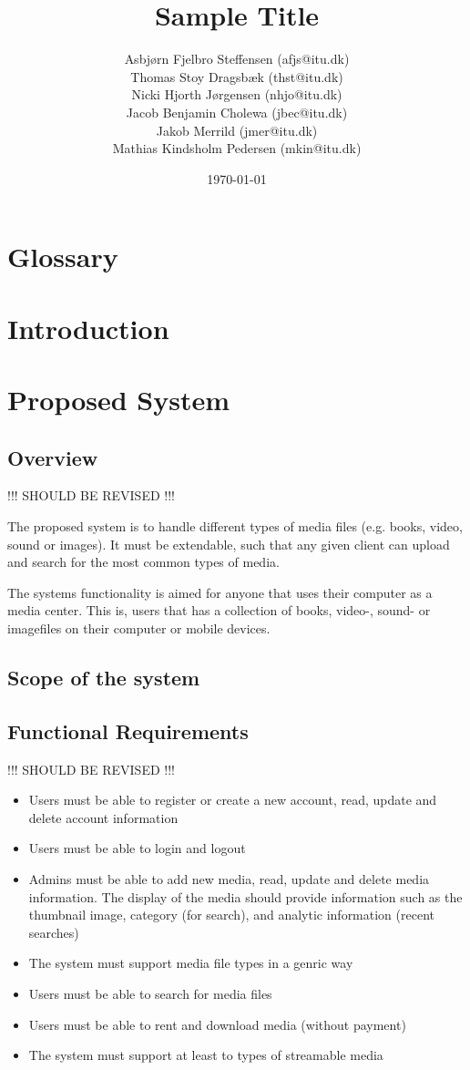\documentclass{report}
\title{Sample Title}
\date{\today}
\author{Asbj\o rn Fjelbro Steffensen (afjs@itu.dk)\\ Thomas Stoy Dragsb\ae k (thst@itu.dk)\\ Nicki Hjorth J\o rgensen (nhjo@itu.dk)\\ Jacob Benjamin Cholewa (jbec@itu.dk)\\ Jakob Merrild (jmer@itu.dk)\\ Mathias Kindsholm Pedersen (mkin@itu.dk)}
\begin{document}
\maketitle
\newpage
\tableofcontents

\chapter{Glossary}


\chapter{Introduction}




\chapter{Proposed System}

\section{Overview}

!!! SHOULD BE REVISED !!!

The proposed system is to handle different types of media files (e.g. books, video, sound or images). It must be extendable, such that any given client can upload and search for the most common types of media.

The systems functionality is aimed for anyone that uses their computer as a media center. This is, users that has a collection of books, video-, sound- or imagefiles on their computer or mobile devices.

\section{Scope of the system}


\section{Functional Requirements}
!!! SHOULD BE REVISED !!!
\begin{itemize}
\item Users must be able to register or create a new account, read, update and delete  account information
\item Users must be able to login and logout
\item Admins must be able to add new media, read, update and delete media information. The display of the media should provide information such as the thumbnail image, category (for search), and analytic information (recent searches)
\item The system must support media file types in a genric way
\item Users must be able to search for media files
\item Users must be able to rent and download media (without payment)
\item The system must support at least to types of streamable media
\end{itemize}
\end{document}
